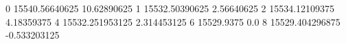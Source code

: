 0 15540.56640625 10.62890625
1 15532.50390625 2.56640625
2 15534.12109375 4.18359375
4 15532.251953125 2.314453125
6 15529.9375 0.0
8 15529.404296875 -0.533203125
